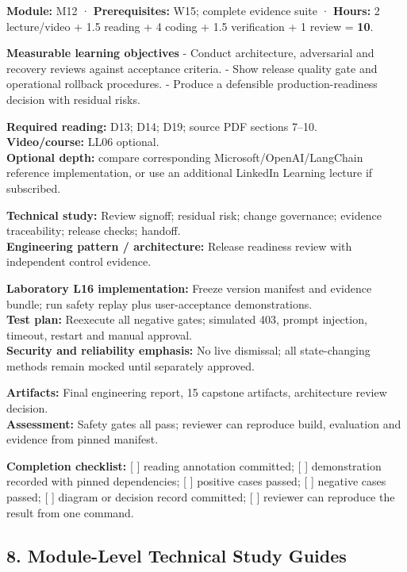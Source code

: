 \documentclass[
  10pt,
]{article}
\begin{document}
\textbf{Module:} M12 · \textbf{Prerequisites:} W15; complete evidence
suite · \textbf{Hours:} 2 lecture/video + 1.5 reading + 4 coding + 1.5
verification + 1 review = \textbf{10}.

\textbf{Measurable learning objectives} - Conduct architecture,
adversarial and recovery reviews against acceptance criteria. - Show
release quality gate and operational rollback procedures. - Produce a
defensible production-readiness decision with residual risks.

\textbf{Required reading:} D13; D14; D19; source PDF sections 7--10.\\
\textbf{Video/course:} LL06 optional.\\
\textbf{Optional depth:} compare corresponding
Microsoft/OpenAI/LangChain reference implementation, or use an
additional LinkedIn Learning lecture if subscribed.

\textbf{Technical study:} Review signoff; residual risk; change
governance; evidence traceability; release checks; handoff.\\
\textbf{Engineering pattern / architecture:} Release readiness review
with independent control evidence.

\textbf{Laboratory L16 implementation:} Freeze version manifest and
evidence bundle; run safety replay plus user-acceptance
demonstrations.\\
\textbf{Test plan:} Reexecute all negative gates; simulated 403, prompt
injection, timeout, restart and manual approval.\\
\textbf{Security and reliability emphasis:} No live dismissal; all
state-changing methods remain mocked until separately approved.

\textbf{Artifacts:} Final engineering report, 15 capstone artifacts,
architecture review decision.\\
\textbf{Assessment:} Safety gates all pass; reviewer can reproduce
build, evaluation and evidence from pinned manifest.

\textbf{Completion checklist:} {[} {]} reading annotation committed; {[}
{]} demonstration recorded with pinned dependencies; {[} {]} positive
cases passed; {[} {]} negative cases passed; {[} {]} diagram or decision
record committed; {[} {]} reviewer can reproduce the result from one
command.

\subsection{8. Module-Level Technical Study
Guides}\label{module-level-technical-study-guides}
\end{document}
